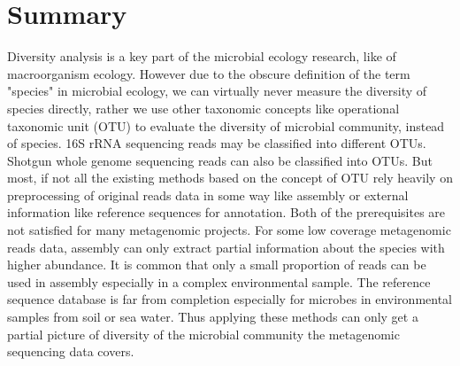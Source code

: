   

\section{Summary}

Diversity analysis is a key part of the microbial ecology research, like of
macroorganism ecology. However due to the obscure definition of the term
"species" in microbial ecology, we can virtually never measure the diversity of
species directly, rather we use other taxonomic concepts like operational
taxonomic unit (OTU) to evaluate the diversity of microbial community, instead
of species. 16S rRNA sequencing reads may be classified into different OTUs.
Shotgun whole genome sequencing reads can also be classified into OTUs. But
most, if not all the existing methods based on the concept of OTU rely heavily on  
preprocessing of original reads data in some way like assembly or external 
information like reference sequences for annotation. Both of the prerequisites
are not satisfied for many metagenomic projects. For some low coverage
metagenomic reads data, assembly can only extract partial information about the
species with higher abundance. It is common that only a small proportion of
reads can be used in assembly especially in a complex environmental sample. \cite{Howe2012} The reference sequence database is far from
completion especially for microbes in environmental samples from soil or sea water.
Thus applying these methods can only get a partial picture of diversity of
the microbial community the metagenomic sequencing data covers. 

